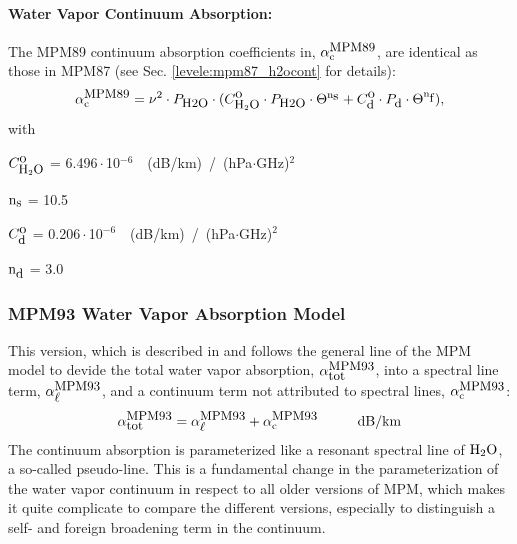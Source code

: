 \paragraph{Water Vapor Continuum Absorption:}
\label{levele:mpm89_h2ocont}
The MPM89 continuum absorption coefficients in, $\alpha^{\mbox{\rm \small MPM89}}_{\rm c}$, 
are identical as those in MPM87 (see Sec. \ref{levele:mpm87_h2ocont} for 
details):
\begin{equation} 
  \label{eq:mpm89:cont}
  \alpha^{\mbox{\rm \small MPM89}}_{\rm c} = \nu^2 \cdot P_{\mbox{\rm \small H2O}} \cdot 
                (C^{\mbox{\rm o}}_{\mbox{\rm \small H}_{2}\mbox{\rm \small O}} \cdot P_{\mbox{\rm \small H2O}} \cdot \Theta^{{\rm n}_{\mbox{\rm \small s}}} + 
                 C^{\mbox{\rm o}}_{\mbox{\rm \small d}} \cdot P_{\mbox{\rm \small d}}  \cdot \Theta^{{\rm n}_{\mbox{\rm \small f}}}),
\end{equation}
with
\begin{description}
\item{$C^{\mbox{\rm o}}_{\mbox{\rm \small H}_{2}\mbox{\rm \small O}}$}   =  6.496\,$\cdot$\,10$^{-6}$~~(dB/km)~/~(hPa$\cdot$GHz)$^2$
\item{${\rm n}_{\mbox{\rm \small s}}$}    = 10.5
\item{$C^{\mbox{\rm o}}_{\mbox{\rm \small d}}$}   =  0.206\,$\cdot$\,10$^{-6}$~~(dB/km)~/~(hPa$\cdot$GHz)$^2$
\item{${\rm n}_{\mbox{\rm \small d}}$}    =  3.0
\end{description}





\subsubsection{MPM93 Water Vapor Absorption Model}
\label{leveld:mpm93}
This version, which is described in \citet{liebeetal:93} and 
follows the general line of the MPM model to devide the total 
water vapor absorption, $\alpha^{\mbox{\rm \small MPM93}}_{\mbox{\small tot}}$, into a spectral line 
term, $\alpha^{\mbox{\rm \small MPM93}}_{\mbox{\small $\ell$}}$, and a continuum term not attributed to 
spectral lines, $\alpha^{\mbox{\rm \small MPM93}}_{\rm c}$:
\begin{equation}
  \label{eq:mpm93_abs}
  \alphampmntot = \alphampmnl + \alphampmnc\hspace*{10mm}\mbox{dB/km}
\end{equation}
The continuum absorption is parameterized like a
resonant spectral line of $\mbox{H}_2\mbox{O}$, a so-called pseudo-line. This is a 
fundamental change in the parameterization of the water vapor
continuum in respect to all older versions of MPM, which makes it 
quite complicate to compare the different versions, especially to 
distinguish a self- and foreign broadening term in the continuum.




